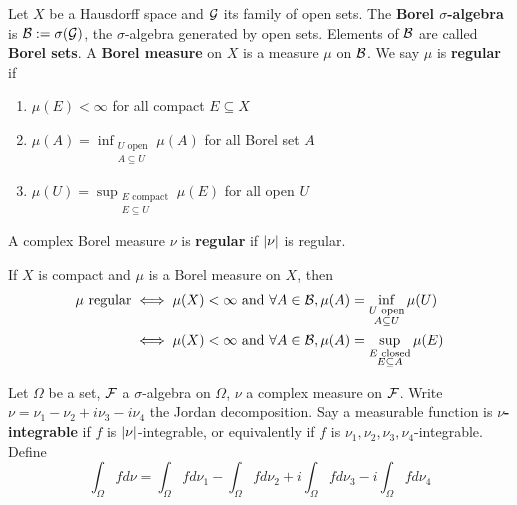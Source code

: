 \documentclass{article}
\begin{document}
\begin{dfn*}
  Let $X$ be a Hausdorff space and $\mathcal G$ its family of open sets. The {\bf Borel $\sigma$-algebra} is $\mathcal B := \sigma(\mathcal G)$, the $\sigma$-algebra generated by open sets. Elements of $\mathcal B$ are called {\bf Borel sets}. A {\bf Borel measure} on $X$ is a measure $\mu$ on $\mathcal B$. We say $\mu$ is {\bf regular} if
  \begin{enumerate}
    \item $\mu(E) < \infty$ for all compact $E \subseteq X$
    \item $\mu(A) = \inf_{\substack{U \text{ open} \\ A \subseteq U}} \mu(A)$ for all Borel set $A$
    \item $\mu(U) = \sup_{\substack{E \text{ compact} \\ E \subseteq U}} \mu(E)$ for all open $U$
  \end{enumerate}
  A complex Borel measure $\nu$ is {\bf regular} if $\left\lvert \nu\right\rvert$ is regular.
\end{dfn*}

If $X$ is compact and $\mu$ is a Borel measure on $X$, then
\begin{align*}
  \mu \text{ regular}
  & \iff \mu(X) < \infty \text{ and } \forall A \in \mathcal B, \mu(A) = \inf_{\substack{U \text{ open} \\ A \subseteq U}} \mu(U) \\
  & \iff \mu(X) < \infty \text{ and } \forall A \in \mathcal B, \mu(A) = \sup_{\substack{E \text{ closed} \\ E \subseteq A}} \mu(E)
\end{align*}

\begin{dfn*}
  Let $\Omega$ be a set, $\mathcal F$ a $\sigma$-algebra on $\Omega$, $\nu$ a complex measure on $\mathcal F$. Write $\nu = \nu_1 - \nu_2 + i\nu_3 - i\nu_4$ the Jordan decomposition. Say a measurable function is {\bf $\nu$-integrable} if $f$ is $\left\lvert \nu\right\rvert$-integrable, or equivalently if $f$ is $\nu_1, \nu_2, \nu_3, \nu_4$-integrable. Define
  $$\int_\Omega f d\nu = \int_\Omega f d\nu_1 - \int_\Omega f d\nu_2 + i\int_\Omega f d\nu_3 - i\int_\Omega f d\nu_4$$
\end{dfn*}

\newlec
\end{document}
